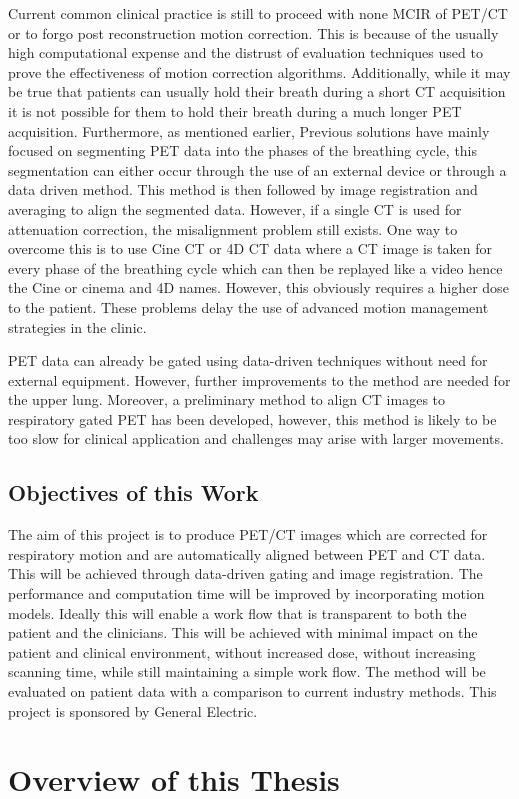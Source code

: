         Current common clinical practice is still to proceed with none \gls{MCIR} of \gls{PET}/\gls{CT} or to forgo post reconstruction motion correction. This is because of the usually high computational expense and the distrust of evaluation techniques used to prove the effectiveness of motion correction algorithms. Additionally, while it may be true that patients can usually hold their breath during a short \gls{CT} acquisition it is not possible for them to hold their breath during a much longer \gls{PET} acquisition. Furthermore, as mentioned earlier, Previous solutions have mainly focused on segmenting PET data into the phases of the breathing cycle, this segmentation can either occur through the use of an external device or through a data driven method. This method is then followed by image registration and averaging to align the segmented data. However, if a single CT is used for attenuation correction, the misalignment problem still exists. One way to overcome this is to use Cine CT or 4D CT data where a CT image is taken for every phase of the breathing cycle which can then be replayed like a video hence the Cine or cinema and 4D names. However, this obviously requires a higher dose to the patient. These problems delay the use of advanced motion management strategies in the clinic.
        
        PET data can already be gated using data-driven techniques without need for external equipment. However, further improvements to the method are needed for the upper lung. Moreover, a preliminary method to align CT images to respiratory gated PET has been developed, however, this method is likely to be too slow for clinical application and challenges may arise with larger movements.
        
        \subsection{Objectives of this Work} \label{objectives_of_this_work}
            The aim of this project is to produce PET/CT images which are corrected for respiratory motion and are automatically aligned between PET and CT data. This will be achieved through data-driven gating and image registration. The performance and computation time will be improved by incorporating motion models. Ideally this will enable a work flow that is transparent to both the patient and the clinicians. This will be achieved with minimal impact on the patient and clinical environment, without increased dose, without increasing scanning time, while still maintaining a simple work flow. The method will be evaluated on patient data with a comparison to current industry methods. This project is sponsored by General Electric.
    
    \section{Overview of this Thesis}  \label{overview_of_this_thesis}
        \blindtext
